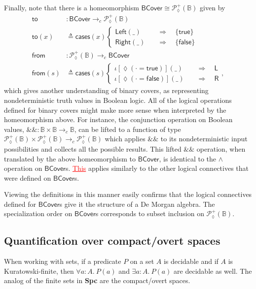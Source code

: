 \documentclass[conference]{IEEEtran}
\newcommand{\PLower}{\mathcal{P}_\lozenge}
\newcommand{\cto}{\to_c}
\newcommand{\bool}{\mathbb{B}}
\newcommand{\wildcard}{\_}
\newcommand{\oinclf}[1]{\iota[{#1}]}
\newcommand{\oincl}[2]{\oinclf{#1} \left({#2}\right)}
\newcommand{\Branch}{\Rightarrow}
\newcommand{\btrue}{\mathsf{true}}
\newcommand{\bfalse}{\mathsf{false}}
\newcommand{\BCover}{\mathsf{BCover}}
\newcommand{\grammar}[1]{\textcolor{red}{\underline{#1}}}
\begin{document}
Finally, note that there is a homeomorphism $\BCover \cong \PLower^+(\bool)$ given by
\begin{align*}
\mathsf{to} &: \BCover \cto \PLower^+(\bool)
\\ \mathsf{to}(x) &\triangleq
  \mathsf{cases}(x)
  \begin{cases}
\mathsf{Left}(\wildcard)
 \quad &\Branch \quad
 \{ \btrue \}
\\
\mathsf{Right}(\wildcard)
 \quad &\Branch \quad
 \{ \bfalse \}
  \end{cases}
\\
\mathsf{from} &: \PLower^+(\bool) \cto \BCover
\\ \mathsf{from}(s) &\triangleq
  \mathsf{cases}(s)
  \begin{cases}
 \oincl{\lozenge(\cdot = \btrue)}{\wildcard}
 \quad &\Branch \quad
 \mathsf{L}
\\
 \oincl{\lozenge(\cdot = \bfalse)}{\wildcard}
 \quad &\Branch \quad
 \mathsf{R}
  \end{cases},
\end{align*}
which gives another understanding of binary covers, as representing nondeterministic truth values in Boolean logic. All of the logical operations defined for binary covers might make more sense when interpreted by the homeomorphism above. For instance, the conjunction operation on Boolean values,
$\&\& : \bool \times \bool \cto \bool$, can be lifted to a function of type $\PLower^+(\bool) \times \PLower^+(\bool) \cto \PLower^+(\bool)$ which applies $\&\&$ to its nondeterministic input possibilities and collects all the possible results. This lifted $\&\&$ operation, when translated by the above homeomorphism to $\BCover$, is identical to the $\wedge$ operation on $\BCover$s. \grammar{This} applies similarly to the other logical connectives that were defined on $\BCover$s.

Viewing the definitions in this manner easily confirms that the logical connectives defined for $\BCover$s give it the structure of a De Morgan algebra.
The specialization order on $\BCover$s corresponds to subset inclusion on $\PLower^+(\bool)$.

\subsection{Quantification over compact/overt spaces}

When working with sets, if a predicate $P$ on a set $A$ is decidable and if $A$ is Kuratowski-finite, then $\forall a : A.\ P(a)$ and $\exists a : A.\ P(a)$ are decidable as well. The analog of the finite sets in \textbf{Spc} are the compact/overt spaces.
\end{document}
